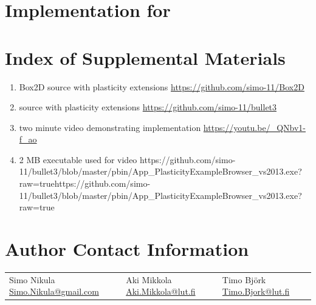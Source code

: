 \documentclass{jcgt}
\begin{document}
\section{Implementation for \cbullet}

\small



\section*{Index of Supplemental Materials}

\begin{enumerate}
\item Box2D source with plasticity extensions 
 \href{https://github.com/simo-11/Box2D}{https://github.com/simo-11/Box2D}

\item \cbullet source with plasticity extensions 
 \href{https://github.com/simo-11/bullet3}{https://github.com/simo-11/bullet3}
\item two minute video demonstrating \cbullet implementation 
 \href{https://youtu.be/_QNbv1-f_ao}{https://youtu.be/_QNbv1-f_ao}
\item 2 MB executable used for \cbullet video {https://github.com/simo-11/bullet3/blob/master/pbin/App_PlasticityExampleBrowser_vs2013.exe?raw=true}{https://github.com/simo-11/bullet3/blob/master/pbin/App_PlasticityExampleBrowser_vs2013.exe?raw=true}
\end{enumerate}

\section*{Author Contact Information}

\hspace{-2mm}\begin{tabular}{p{}p{}p{}}
Simo Nikula\newline
\href{mailto:Simo.Nikula@gmail.com}{Simo.Nikula@gmail.com}
&
Aki Mikkola\newline
\href{mailto:Aki.Mikkola@lut.fi}{Aki.Mikkola@lut.fi}
&
Timo Björk\newline
\href{mailto:Timo.Bjork@lut.fi}{Timo.Bjork@lut.fi}
\end{tabular}


\afterdoc
\end{document}
